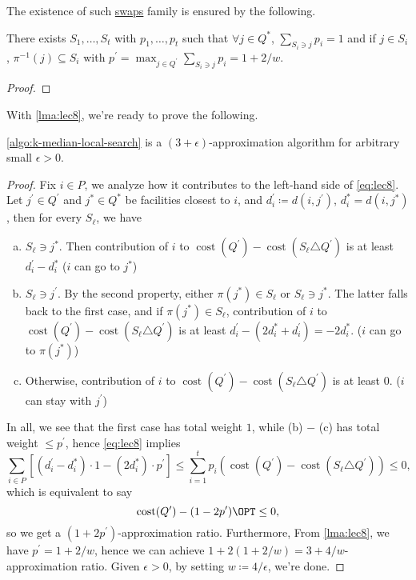 The existence of such \hyperref[not:swap]{swaps} family is ensured by the following.
\begin{lemma}\label{lma:lec8}
	There exists \(S_1, \ldots, S_t\) with \(p_1, \ldots  , p_t\) such that \(\forall j\in Q^{\ast} \), \(\sum_{S_i \ni j}p_i = 1\) and if \(j\in S_i\), \(\pi ^{-1} (j)\subseteq S_i\) with \(p^\prime = \max _{j\in Q^\prime }\sum_{S_i\ni j}p_i = 1 + 2 / w\).
\end{lemma}
\begin{proof}

\end{proof}

With \autoref{lma:lec8}, we're ready to prove the following.

\begin{theorem}\label{thm:lec8}
	\autoref{algo:k-median-local-search} is a \((3 + \epsilon)\)-approximation algorithm for arbitrary small \(\epsilon > 0\).
\end{theorem}
\begin{proof}
	Fix \(i\in P\), we analyze how it contributes to the left-hand side of \autoref{eq:lec8}. Let \(j^\prime \in Q^\prime \) and \(j^{\ast} \in Q^{\ast} \) be facilities closest to \(i\), and \(d_i^\prime \coloneqq d(i, j^\prime )\), \(d_i^{\ast} = d(i, j^{\ast} )\), then for every \(S_{\ell}\), we have
	\begin{enumerate}[(a)]
		\item \(S_{\ell }\ni j^{\ast} \). Then contribution of \(i\) to \(\mathop{\mathrm{cost}}(Q^\prime ) - \mathop{\mathrm{cost}}(S_{\ell }\triangle Q^\prime)\) is at least \(d_i^\prime - d_i^{\ast}\) (\(i\) can go to \(j^{\ast} \))
		\item \(S_{\ell }\ni j^\prime \). By the second property, either \(\pi (j^{\ast} )\in S_{\ell } \) or \(S_{\ell }\ni j^{\ast}\). The latter falls back to the first case, and if \(\pi (j^{\ast} )\in S_{\ell } \), contribution of \(i\) to \(\mathop{\mathrm{cost}}(Q^\prime ) - \mathop{\mathrm{cost}}(S_{\ell }\triangle Q^\prime)\) is at least \(d_i^\prime - (2d_i^{\ast} + d_i^\prime ) = -2d_i^{\ast}\). (\(i\) can go to \(\pi (j^{\ast} )\))
		\item Otherwise, contribution of \(i\) to \(\mathop{\mathrm{cost}}(Q^\prime ) - \mathop{\mathrm{cost}}(S_{\ell }\triangle Q^\prime)\) is at least \(0\). (\(i\) can stay with \(j^\prime \))
	\end{enumerate}

	In all, we see that the first case has total weight \(1\), while (b) \(-\) (c) has total weight \(\leq p^\prime \), hence \autoref{eq:lec8} implies
	\[
		\sum_{i\in P} \left[ (d_i^\prime - d_i^{\ast} )\cdot 1 - (2d_i^{\ast} )\cdot p^\prime \right] \leq \sum_{i=1} ^t p_i(\mathop{\mathrm{cost}}(Q^\prime ) - \mathop{\mathrm{cost}}(S_{\ell }\triangle Q^\prime)) \leq 0,
	\]
	which is equivalent to say
	\[
		\mathop{\mathrm{cost}}(Q^\prime ) - (1 - 2p^\prime )\OPT \leq 0,
	\]
	so we get a \((1 + 2p^\prime )\)-approximation ratio. Furthermore, From \autoref{lma:lec8}, we have \(p^\prime = 1 + 2 / w\), hence we can achieve \(1 + 2(1 + 2 / w) = 3 + 4 / w\)-approximation ratio. Given \(\epsilon > 0\), by setting \(w \coloneqq 4/\epsilon \), we're done.
\end{proof}